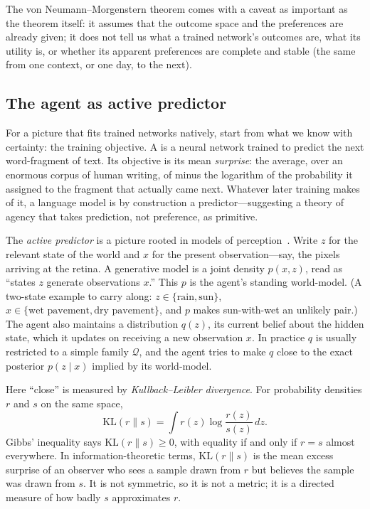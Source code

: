 The von Neumann--Morgenstern theorem comes with a caveat as important as the theorem itself: it assumes that the outcome space and the preferences are already given; it does not tell us what a trained network's outcomes are, what its utility is, or whether its apparent preferences are complete and stable (the same from one context, or one day, to the next).

\subsection{The agent as active predictor}

For a picture that fits trained networks natively, start from what we know with certainty: the training objective. A  is a neural network trained to predict the next word-fragment of text. Its objective is its mean \emph{surprise}: the average, over an enormous corpus of human writing, of minus the logarithm of the probability it assigned to the fragment that actually came next. Whatever later training makes of it, a language model is by construction a predictor---suggesting a theory of agency that takes prediction, not preference, as primitive.

The \emph{active predictor} is a picture rooted in models of perception~\cite{rao1999}. Write $z$ for the relevant state of the world and $x$ for the present observation---say, the pixels arriving at the retina. A generative model is a joint density $p(x,z)$, read as ``states $z$ generate observations $x$.'' This $p$ is the agent's standing world-model. (A two-state example to carry along: $z\in\{\text{rain},\text{sun}\}$, $x\in\{\text{wet pavement},\text{dry pavement}\}$, and $p$ makes sun-with-wet an unlikely pair.) The agent also maintains a distribution $q(z)$, its current belief about the hidden state, which it updates on receiving a new observation $x$. In practice $q$ is usually restricted to a simple family $\mathcal Q$, and the agent tries to make $q$ close to the exact posterior $p(z\mid x)$ implied by its world-model.

Here ``close'' is measured by \emph{Kullback--Leibler divergence}. For probability densities $r$ and $s$ on the same space,
\[
   \mathrm{KL}(r\|s)=\int r(z)\log\frac{r(z)}{s(z)}\,dz.
\]
Gibbs' inequality says $\mathrm{KL}(r\|s)\ge0$, with equality if and only if $r=s$ almost everywhere. In information-theoretic terms, $\mathrm{KL}(r\|s)$ is the mean excess surprise of an observer who sees a sample drawn from $r$ but believes the sample was drawn from $s$. It is not symmetric, so it is not a metric; it is a directed measure of how badly $s$ approximates $r$.

